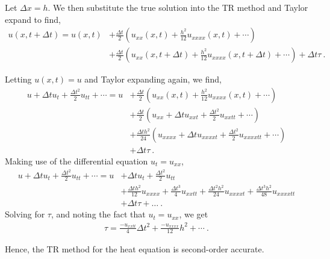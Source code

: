 
\begin{questions}


\begin{solution}

Let $\Delta x = h$. We then substitute the true solution into the TR method and Taylor expand to find,
\begin{align*}
u(x,t + \Delta t) = u(x,t) &+ \frac{\Delta t}{2}\left( u_{xx}(x,t) + \frac{h^2}{12}u_{xxxx}(x,t) + \cdots \right)\\
&+ \frac{\Delta t}{2}\left( u_{xx}(x,t + \Delta t) + \frac{h^2}{12}u_{xxxx}(x,t + \Delta t) + \cdots \right) + \Delta t \tau~.
\end{align*}

Letting $u(x,t) = u$ and Taylor expanding again, we find,
\begin{align*}
u + \Delta t u_t + \frac{\Delta t^2}{2}u_{tt} + \cdots = u &+ \frac{\Delta t}{2} \left(u_{xx}(x,t) + \frac{h^2}{12}u_{xxxx}(x,t) + \cdots \right) \\
& +\frac{\Delta t}{2}\left(u_{xx} + \Delta t u_{xxt} + \frac{\Delta t^2}{2}u_{xxtt} + \cdots \right) \\
& + \frac{\Delta th^2}{24}\left(u_{xxxx} + \Delta t u_{xxxxt} + \frac{\Delta t^2}{2}u_{xxxxtt} + \cdots \right)\\
& + \Delta t \tau~.
\end{align*}
Making use of the differential equation $u_t=u_{xx}$,
\begin{align*}
u + \Delta t u_t + \frac{\Delta t^2}{2}u_{tt} + \cdots = u &+\Delta t u_t + \frac{\Delta t^2}{2} u_{tt}\\
&+\frac{\Delta t h^2}{12}u_{xxxx}+\frac{\Delta t^3}{4}u_{xxtt}+\frac{\Delta t^2h^2}{24}u_{xxxxt}+\frac{\Delta t^3h^2}{48}u_{xxxxtt}\\
& + \Delta t \tau+\dots~.
\end{align*}
Solving for $\tau$, and noting the fact that $u_t = u_{xx}$, we get
\begin{align*}
\tau = \frac{-u_{xxtt}}{4}\Delta t^2 + \frac{-u_{xxxx}}{12} h^2 + \cdots~.
\end{align*}

Hence, the TR method for the heat equation is second-order accurate.

\end{solution}

\end{questions}
